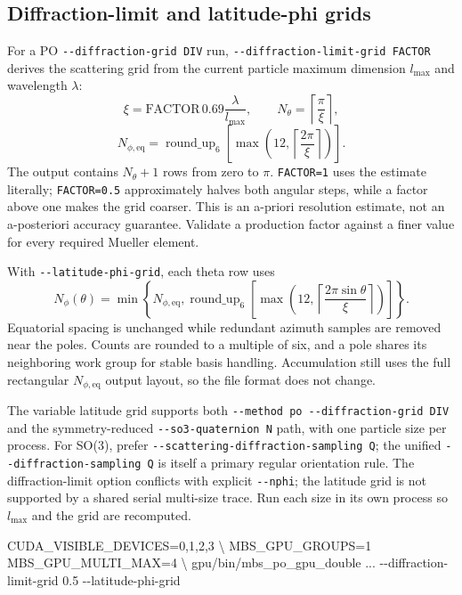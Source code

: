 \documentclass[
  10pt,
  a4paper,
]{article}
\newenvironment{Shaded}{}{}
\newcommand{\AttributeTok}[1]{\textcolor[rgb]{0.49,0.56,0.16}{#1}}
\newcommand{\DataTypeTok}[1]{\textcolor[rgb]{0.56,0.13,0.00}{#1}}
\newcommand{\ExtensionTok}[1]{#1}
\newcommand{\NormalTok}[1]{#1}
\newcommand{\OperatorTok}[1]{\textcolor[rgb]{0.40,0.40,0.40}{#1}}
\newcommand{\VariableTok}[1]{\textcolor[rgb]{0.10,0.09,0.49}{#1}}
\begin{document}
\subsection{Diffraction-limit and latitude-phi grids}

For a PO \texttt{-\/-diffraction-grid DIV} run,
\texttt{-\/-diffraction-limit-grid FACTOR} derives the scattering grid from
the current particle maximum dimension $l_{\max}$ and wavelength $\lambda$:
\[
 \xi=\mathrm{FACTOR}\,0.69\frac{\lambda}{l_{\max}},\qquad
 N_\theta=\left\lceil\frac{\pi}{\xi}\right\rceil,
\]
\[
 N_{\phi,\mathrm{eq}}=
 \operatorname{round\_up}_6\!\left[
  \max\!\left(12,\left\lceil\frac{2\pi}{\xi}\right\rceil\right)
 \right].
\]
The output contains $N_\theta+1$ rows from zero to $\pi$.
\texttt{FACTOR=1} uses the estimate literally; \texttt{FACTOR=0.5}
approximately halves both angular steps, while a factor above one makes the
grid coarser. This is an a-priori resolution estimate, not an a-posteriori
accuracy guarantee. Validate a production factor against a finer value for
every required Mueller element.

With \texttt{-\/-latitude-phi-grid}, each theta row uses
\[
 N_\phi(\theta)=\min\!\left\{N_{\phi,\mathrm{eq}},
 \operatorname{round\_up}_6\!\left[
  \max\!\left(12,
   \left\lceil\frac{2\pi\sin\theta}{\xi}\right\rceil\right)
 \right]\right\}.
\]
Equatorial spacing is unchanged while redundant azimuth samples are removed
near the poles. Counts are rounded to a multiple of six, and a pole shares
its neighboring work group for stable basis handling. Accumulation still uses
the full rectangular $N_{\phi,\mathrm{eq}}$ output layout, so the file format
does not change.

The variable latitude grid supports both
\texttt{-\/-method po -\/-diffraction-grid DIV} and the symmetry-reduced
\texttt{-\/-so3-quaternion N} path, with one particle size per process.  For
SO(3), prefer \texttt{-\/-scattering-diffraction-sampling Q}; the unified
\texttt{-\/-diffraction-sampling Q} is itself a primary regular orientation
rule.  The diffraction-limit option conflicts with explicit
\texttt{-\/-nphi}; the latitude grid is not supported by a shared serial
multi-size trace. Run each size in its own process so $l_{\max}$ and the grid
are recomputed.

\begin{Shaded}
\begin{Highlighting}[]
\VariableTok{CUDA_VISIBLE_DEVICES}\OperatorTok{=}\NormalTok{0,1,2,3 }\DataTypeTok{\textbackslash{}}
\VariableTok{MBS_GPU_GROUPS}\OperatorTok{=}\NormalTok{1 }\VariableTok{MBS_GPU_MULTI_MAX}\OperatorTok{=}\NormalTok{4 }\DataTypeTok{\textbackslash{}}
\ExtensionTok{gpu/bin/mbs_po_gpu_double}\NormalTok{ ... }\AttributeTok{{-}{-}diffraction-limit-grid}\NormalTok{ 0.5 }\AttributeTok{{-}{-}latitude-phi-grid}
\end{Highlighting}
\end{Shaded}
\end{document}
